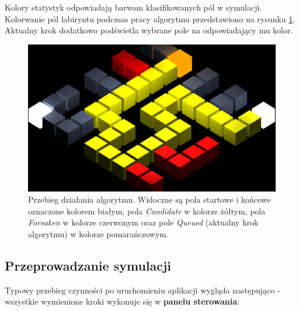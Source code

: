\documentclass[../doc.tex]{subfiles}
\begin{document}
    Kolory statystyk odpowiadają barwom klasifikowanych pól w symulacji. Kolorwanie pól labiryntu podczsas pracy algorytmu przedstawiono na rysunku \ref{fig:colors}. Aktualny krok dodatkowo podświetla wybrane pole na odpowiadający mu kolor.

    \begin{figure}[H]
        \centering
        \includegraphics[width=0.85\linewidth]{figures/colors.png}
        \caption{\centering Przebieg działania algorytmu. Widoczne są pola startowe i końcowe oznaczone kolorem białym, pola \textit{Candidate} w kolorze żółtym, pola \textit{Forsaken} w kolorze czerwonym oraz pole \textit{Queued} (aktualny krok algorytmu) w kolorze pomarańczowym.}
        \label{fig:colors}
    \end{figure}

    \subsection{Przeprowadzanie symulacji}

    Typowy przebieg czynności po uruchomieniu aplikacji wygląda następująco - wszystkie wymienione kroki wykonuje się w \textbf{panelu sterowania}:
\end{document}
